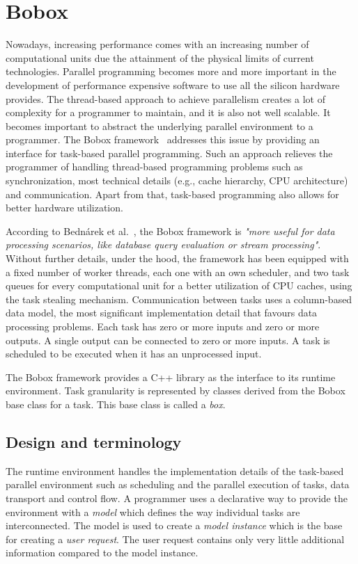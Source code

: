 \chapter{Bobox}
Nowadays, increasing performance comes with an increasing number of computational units due the attainment of the physical limits of current technologies. Parallel programming becomes more and more important in the development of performance expensive software to use all the silicon hardware provides. The thread-based approach to achieve parallelism creates a lot of complexity for a programmer to maintain, and it is also not well scalable. It becomes important to abstract the underlying parallel environment to a programmer. The Bobox framework~\cite{bobox-4, bobox} addresses this issue by providing an interface for task-based parallel programming. Such an approach relieves the programmer of handling thread-based programming problems such as synchronization, most technical details (e.g., cache hierarchy, CPU architecture) and communication. Apart from that, task-based programming also allows for better hardware utilization.

According to Bednárek et al.~\cite{bobox-1}, the Bobox framework is \textit{"more useful for data processing scenarios, like database query evaluation or stream processing"}. Without further details, under the hood, the framework has been equipped with a fixed number of worker threads, each one with an own scheduler, and two task queues for every computational unit for a better utilization of CPU caches, using the task stealing mechanism. Communication between tasks uses a column-based data model, the most significant implementation detail that favours data processing problems. Each task has zero or more inputs and zero or more outputs. A single output can be connected to zero or more inputs. A task is scheduled to be executed when it has an unprocessed input.

The Bobox framework provides a C++ library as the interface to its runtime environment. Task granularity is represented by classes derived from the Bobox base class for a task. This base class is called a \emph{box}.

\section{Design and terminology}
\label{bobox-terminology}
The runtime environment handles the implementation details of the task-based parallel environment such as scheduling and the parallel execution of tasks, data transport and control flow. A programmer uses a declarative way to provide the environment with a \emph{model} which defines the way individual tasks are interconnected. The model is used to create a \emph{model instance} which is the base for creating a \emph{user request}. The user request contains only very little additional information compared to the model instance.


